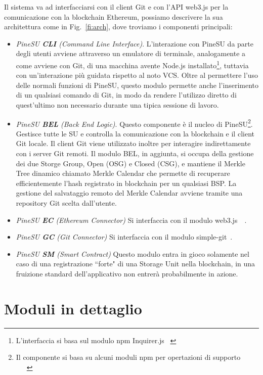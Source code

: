 Il sistema va ad interfacciarsi con il client Git e con l'API \textsf{web3.js} per la comunicazione
con la blockchain Ethereum, possiamo descrivere la sua architettura come in Fig.~\ref{fi:arch}, dove troviamo i componenti principali:
\begin{itemize}
    \item \emph{PineSU \textbf{CLI} (Command Line Interface)}. L'interazione con PineSU da parte degli utenti avviene attraverso un emulatore di terminale, analogamente a come avviene con Git, di una macchina avente Node.js installato\footnote{L'interfaccia si basa sul modulo npm Inquirer.js ~\cite{inquirer-github-21}}, tuttavia con un'interazione più guidata rispetto al noto VCS. Oltre al permettere l'uso delle normali funzioni di PineSU, questo modulo permette anche l'inserimento di un qualsiasi comando di Git, in modo da rendere l'utilizzo diretto di quest'ultimo non necessario durante una tipica sessione di lavoro.
    \item \emph{PineSU \textbf{BEL} (Back End Logic)}. Questo componente è il nucleo di PineSU\footnote{Il componente si basa su alcuni moduli npm per opertazioni di supporto ~\cite{adm-zip-github-21}~\cite{chalk-github-21}~\cite{merkle-tools-github-21}}. Gestisce tutte le SU e controlla la comunicazione con la blockchain e il client Git locale.
    Il client Git viene utilizzato inoltre per interagire indirettamente con i server Git remoti.
    Il modulo BEL, in aggiunta, si occupa della gestione dei due Storge Group, Open (OSG) e Closed (CSG), e
    mantiene il Merkle Tree dinamico chiamato Merkle Calendar che permette di recuperare efficientemente
    l'hash registrato in blockchain per un qualsiasi BSP. La gestione del salvataggio remoto del Merkle Calendar avviene tramite una repository Git scelta dall'utente.
    \item \emph{PineSU \textbf{EC} (Ethereum Connector)} Si interfaccia con il modulo \textsf{web3.js}~\cite{web3js-github-21}~\cite{web3js-doc-21}. 
    \item \emph{PineSU \textbf{GC} (Git Connector)} Si interfaccia con il modulo \textsf{simple-git}~\cite{simple-git-github-21}. 
    \item \emph{PineSU \textbf{SM} (Smart Contract)} Questo modulo entra in gioco solamente nel caso di una registrazione ``forte" di una Storage Unit nella blockchain, in una fruizione standard dell'applicativo non entrerà probabilmente in azione.
\end{itemize}

\section{Moduli in dettaglio}
